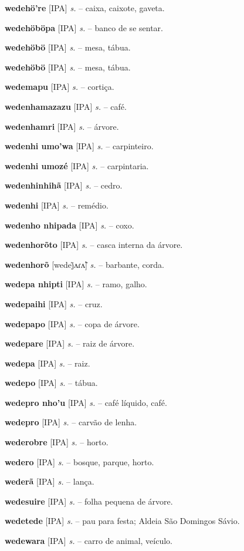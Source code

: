 \textbf{wedehö're} [IPA] \textit{s.} -- caixa, caixote, gaveta.

\textbf{wedehöböpa} [IPA] \textit{s.} -- banco de se sentar.

\textbf{wedehöbö} [IPA] \textit{s.} -- mesa, tábua.

\textbf{wedehöbö} [IPA] \textit{s.} -- mesa, tábua.

\textbf{wedemapu} [IPA] \textit{s.} -- cortiça.

\textbf{wedenhamazazu} [IPA] \textit{s.} -- café.

\textbf{wedenhamri} [IPA] \textit{s.} -- árvore.

\textbf{wedenhi umo'wa} [IPA] \textit{s.} -- carpinteiro.

\textbf{wedenhi umozé} [IPA] \textit{s.} -- carpintaria.

\textbf{wedenhinhihã} [IPA] \textit{s.} -- cedro.

\textbf{wedenhi} [IPA] \textit{s.} -- remédio.

\textbf{wedenho nhipada} [IPA] \textit{s.} -- coxo.

\textbf{wedenhorõto} [IPA] \textit{s.} -- casca interna da árvore.

\textbf{wedenhorõ} [wedej̃ʌɾʌ̃] \textit{s.} -- barbante, corda.

\textbf{wedepa nhipti} [IPA] \textit{s.} -- ramo, galho.

\textbf{wedepaihi} [IPA] \textit{s.} -- cruz.

\textbf{wedepapo} [IPA] \textit{s.} -- copa de árvore.

\textbf{wedepare} [IPA] \textit{s.} -- raiz de árvore.

\textbf{wedepa} [IPA] \textit{s.} -- raiz.

\textbf{wedepo} [IPA] \textit{s.} -- tábua.

\textbf{wedepro nho'u} [IPA] \textit{s.} -- café líquido, café.

\textbf{wedepro} [IPA] \textit{s.} -- carvão de lenha.

\textbf{wederobre} [IPA] \textit{s.} -- horto.

\textbf{wedero} [IPA] \textit{s.} -- bosque, parque, horto.

\textbf{wederã} [IPA] \textit{s.} -- lança.

\textbf{wedesuire} [IPA] \textit{s.} -- folha pequena de árvore.

\textbf{wedetede} [IPA] \textit{s.} -- pau para festa; Aldeia São Domingos Sávio.

\textbf{wedewara} [IPA] \textit{s.} -- carro de animal, veículo.

